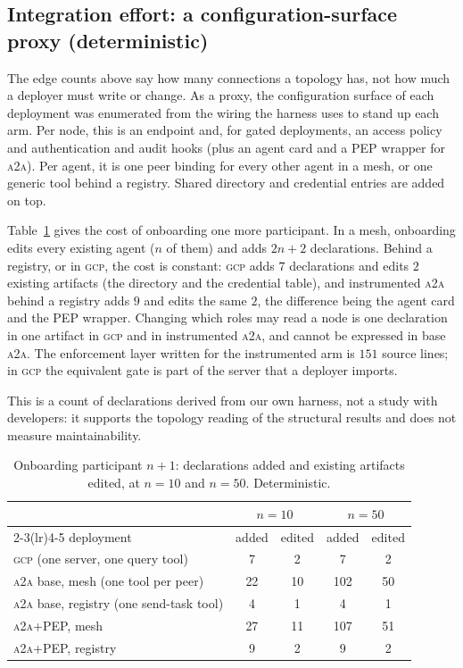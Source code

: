 \documentclass[conference,letterpaper]{IEEEtran}
\newcommand{\gcp}{\textsc{gcp}}
\newcommand{\ata}{\textsc{a2a}}
\begin{document}
\subsection{Integration effort: a configuration-surface proxy (deterministic)}
\label{sec:effort}
The edge counts above say how many connections a topology has, not how much a deployer must write or
change. As a proxy, the configuration surface of each deployment was enumerated from the wiring the
harness uses to stand up each arm. Per node, this is an endpoint and, for gated deployments, an access
policy and authentication and audit hooks (plus an agent card and a PEP wrapper for \ata{}). Per
agent, it is one peer binding for every other agent in a mesh, or one generic tool behind a registry.
Shared directory and credential entries are added on top.

Table~\ref{tab:effort} gives the cost of onboarding one more
participant. In a mesh, onboarding edits every existing agent ($n$ of them) and adds $2n+2$
declarations. Behind a registry, or in \gcp{}, the cost is constant: \gcp{} adds $7$ declarations and
edits $2$ existing artifacts (the directory and the credential table), and instrumented \ata{} behind
a registry adds $9$ and edits the same $2$, the difference being the agent card and the PEP wrapper.
Changing which roles may read a node is one declaration in one artifact in \gcp{} and in instrumented
\ata{}, and cannot be expressed in base \ata{}. The enforcement layer written for the instrumented arm
is $151$ source lines; in \gcp{} the equivalent gate is part of the server that a deployer imports.

This is a count of declarations derived from our own harness, not a study with developers: it
supports the topology reading of the structural results and does not measure maintainability.

\begin{table}[H]
\centering
\caption{Onboarding participant $n{+}1$: declarations added and existing artifacts edited, at $n=10$ and
$n=50$. Deterministic.}
\label{tab:effort}
\footnotesize
\setlength{\tabcolsep}{3.5pt}
\begin{tabular}{lcccc}
\toprule
 & \multicolumn{2}{c}{$n=10$} & \multicolumn{2}{c}{$n=50$} \\
\cmidrule(lr){2-3}\cmidrule(lr){4-5}
deployment & added & edited & added & edited \\
\midrule
\gcp{} (one server, one query tool)      & 7 & 2 & 7 & 2 \\
\ata{} base, mesh (one tool per peer)  & 22 & 10 & 102 & 50 \\
\ata{} base, registry (one send-task tool) & 4 & 1 & 4 & 1 \\
\ata{}+PEP, mesh                       & 27 & 11 & 107 & 51 \\
\ata{}+PEP, registry                   & 9 & 2 & 9 & 2 \\
\bottomrule
\end{tabular}
\end{table}
\end{document}
